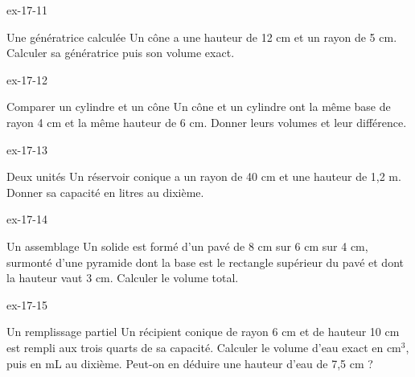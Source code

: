 \begin{blocLivre}{ex-17-11}\begin{exercice}[3]{Une génératrice calculée}
Un cône a une hauteur de 12 cm et un rayon de 5 cm. Calculer sa génératrice puis son volume exact.
\label{fig-ex-17-11}
\end{exercice}\end{blocLivre}
\begin{blocLivre}{ex-17-12}\begin{exercice}[3]{Comparer un cylindre et un cône}
Un cône et un cylindre ont la même base de rayon 4 cm et la même hauteur de 6 cm. Donner leurs volumes et leur différence.
\label{fig-ex-17-12}
\end{exercice}\end{blocLivre}
\begin{blocLivre}{ex-17-13}\begin{exercice}[3]{Deux unités}
Un réservoir conique a un rayon de 40 cm et une hauteur de 1,2 m. Donner sa capacité en litres au dixième.
\label{fig-ex-17-13}
\end{exercice}\end{blocLivre}
\begin{blocLivre}{ex-17-14}\begin{exercice}[3]{Un assemblage}
Un solide est formé d’un pavé de 8 cm sur 6 cm sur 4 cm, surmonté d’une pyramide dont la base est le rectangle supérieur du pavé et dont la hauteur vaut 3 cm. Calculer le volume total.
\label{fig-ex-17-14}
\end{exercice}\end{blocLivre}
\begin{blocLivre}{ex-17-15}\begin{exercice}[3]{Un remplissage partiel}
Un récipient conique de rayon 6 cm et de hauteur 10 cm est rempli aux trois quarts de sa capacité. Calculer le volume d’eau exact en cm$^3$, puis en mL au dixième. Peut-on en déduire une hauteur d’eau de 7,5 cm ?
\label{fig-ex-17-15}
\end{exercice}\end{blocLivre}

\clearpage
